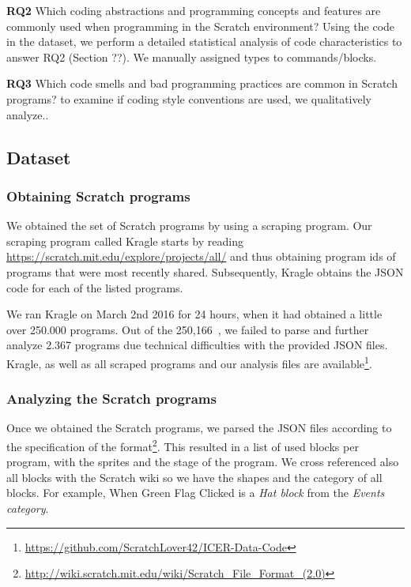 \documentclass{sig-alternate}
\newcommand{\nPrograms}{250,166}
\begin{document}
\textbf{RQ2} Which coding abstractions and programming concepts and features are commonly used when programming in the Scratch environment? Using the code in the dataset, we perform a detailed statistical analysis of code characteristics to answer RQ2 (Section ??). We manually assigned types to commands/blocks.

\textbf{RQ3} Which code smells and bad programming practices are common in Scratch programs?  to examine if coding style conventions are used, we qualitatively analyze..

\subsection{Dataset}
\label{dataset}
\subsubsection{Obtaining Scratch programs}
We obtained the set of Scratch programs by using a scraping program. Our scraping program called Kragle starts by reading \url{https://scratch.mit.edu/explore/projects/all/} and thus obtaining program ids of programs that were most recently shared. Subsequently, Kragle obtains the JSON code for each of the listed programs. 


We ran Kragle on March 2nd 2016 for 24 hours, when it had obtained a little over 250.000 programs. Out of the \nPrograms~, we failed to parse and further analyze 2.367 programs due technical difficulties with the provided JSON files. Kragle, as well as all scraped programs and our analysis files are available\footnote{\url{https://github.com/ScratchLover42/ICER-Data-Code}}.

\subsubsection{Analyzing the Scratch programs}
Once we obtained the Scratch programs, we parsed the JSON files according to the specification of the format\footnote{\url{http://wiki.scratch.mit.edu/wiki/Scratch_File_Format_(2.0)}}. This resulted in a list of used blocks per program, with the sprites and the stage of the program. We cross referenced also all blocks with the Scratch wiki so we have the shapes and the category of all blocks. For example, When Green Flag Clicked is a \emph{Hat block} from the \emph{Events category}.
\end{document}
